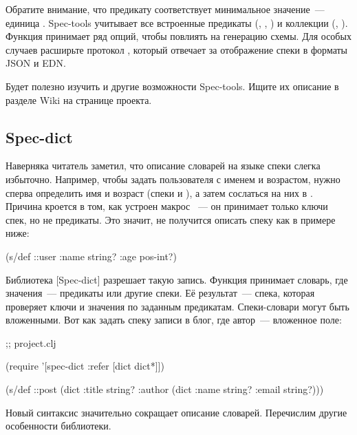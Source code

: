 Обратите внимание, что предикату  соответствует минимальное
значение~--- единица . Spec-tools учитывает все встроенные предикаты
(, , ) и коллекции (,
). Функция  принимает ряд опций, чтобы повлиять на
генерацию схемы. Для особых случаев расширьте протокол ,
который отвечает за отображение спеки в форматы JSON и EDN.

Будет полезно изучить и другие возможности Spec-tools. Ищите их описание в
разделе Wiki на странице проекта.

\subsection{Spec-dict}

Наверняка читатель заметил, что описание словарей на языке спеки слегка
избыточно. Например, чтобы задать пользователя с именем и возрастом, нужно
сперва определить имя и возраст (спеки  и ), а
затем сослаться на них в . Причина кроется в том, как устроен
макрос ~--- он принимает только ключи спек, но не предикаты. Это
значит, не получится описать спеку как в примере ниже:


\begin{clojure}
(s/def ::user
  {:name string?
   :age pos-int?})
\end{clojure}


Библиотека [Spec-dict]
разрешает такую запись. Функция  принимает словарь, где значения~--- предикаты
или другие спеки. Её результат~--- спека, которая проверяет ключи и значения
по заданным предикатам. Спеки-словари могут быть вложенными. Вот как задать
спеку записи в блог, где автор~--- вложенное поле:


\begin{clojure}
 ;; project.clj

(require '[spec-dict :refer [dict dict*]])

(s/def ::post
 (dict {:title string?
        :author (dict {:name string?
                       :email string?})}))
\end{clojure}


Новый синтаксис значительно сокращает описание словарей. Перечислим другие
особенности библиотеки.

